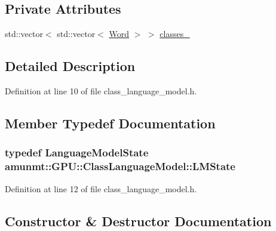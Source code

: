 \subsection*{Private Attributes}
\begin{DoxyCompactItemize}
\item 
std\+::vector$<$ std\+::vector$<$ \hyperlink{namespaceamunmt_a07c85682e789f72cc2fbbc3caf7d3800}{Word} $>$ $>$ \hyperlink{classamunmt_1_1GPU_1_1ClassLanguageModel_ad0a4765e122ba062501ef2112bcce7c0}{classes\+\_\+}
\end{DoxyCompactItemize}


\subsection{Detailed Description}


Definition at line 10 of file class\+\_\+language\+\_\+model.\+h.



\subsection{Member Typedef Documentation}
\subsubsection[{\texorpdfstring{L\+M\+State}{LMState}}]{\setlength{\rightskip}{0pt plus 5cm}typedef {\bf Language\+Model\+State} {\bf amunmt\+::\+G\+P\+U\+::\+Class\+Language\+Model\+::\+L\+M\+State}\hspace{0.3cm}{\ttfamily [private]}}\hypertarget{classamunmt_1_1GPU_1_1ClassLanguageModel_ae3570f0dd0a320300e83f2d282865640}{}\label{classamunmt_1_1GPU_1_1ClassLanguageModel_ae3570f0dd0a320300e83f2d282865640}


Definition at line 12 of file class\+\_\+language\+\_\+model.\+h.



\subsection{Constructor \& Destructor Documentation}
